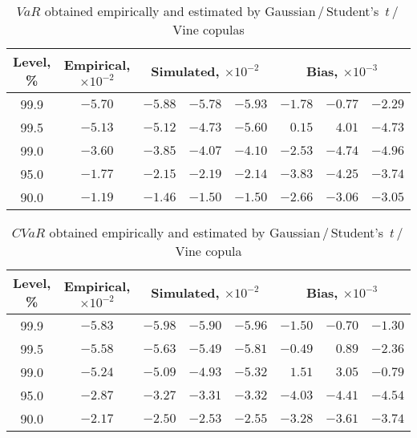 \documentclass{llncs}
\begin{document}
\begin{table}[htbp]
\centering
\caption{$VaR$ obtained empirically and estimated by Gaussian\,/\,Student's~$t$\,/\,Vine copulas}
\label{VaR-results}
\setlength{\tabcolsep}{5pt}
\begin{tabular}{c|c|r@{\,/\,}r@{\,/\,}r|r@{\,/\,}r@{\,/\,}r} \hline
\multicolumn{1}{c|}{Level, \%} & \multicolumn{1}{c|}{Empirical, $\times 10^{-2}$} & \multicolumn{3}{c|}{Simulated, $\times 10^{-2}$} & \multicolumn{3}{c}{Bias, $\times 10^{-3}$} \bigstrut \\ \hline 
99.9 & $-5.70$ & $-5.88$ & $-5.78$ & $-5.93$ & $-1.78$ & $-0.77$ & $-2.29$ \bigstrut[t] \\ 
99.5 & $-5.13$ & $-5.12$ & $-4.73$ & $-5.60$ & $0.15$ & $4.01$ & $-4.73$ \\ 
99.0   & $-3.60$ & $-3.85$ & $-4.07$ & $-4.10$ & $-2.53$ & $-4.74$ & $-4.96$ \\ 
95.0   & $-1.77$ & $-2.15$ & $-2.19$ & $-2.14$ & $-3.83$ & $-4.25$ & $-3.74$ \\ 
90.0   & $-1.19$ & $-1.46$ & $-1.50$ & $-1.50$ & $-2.66$ & $-3.06$ & $-3.05$ \bigstrut[b] \\ \hline
\end{tabular}
\end{table}

\begin{table}[htbp]
\centering
\caption{$CVaR$ obtained empirically and estimated by Gaussian\,/\,Student's~$t$\,/\,Vine copula}
\label{ES-results}
\setlength{\tabcolsep}{5pt}
\begin{tabular}{c|c|r@{\,/\,}r@{\,/\,}r|r@{\,/\,}r@{\,/\,}r} \hline
\multicolumn{1}{c|}{Level, \%} & \multicolumn{1}{c|}{Empirical, $\times 10^{-2}$} & \multicolumn{3}{c|}{Simulated, $\times 10^{-2}$} & \multicolumn{3}{c}{Bias, $\times 10^{-3}$} \bigstrut \\ \hline
99.9 & $-5.83$ & $-5.98$ & $-5.90$ & $-5.96$ & $-1.50$ & $-0.70$ & $-1.30$ \bigstrut[t] \\ 
99.5 & $-5.58$ & $-5.63$ & $-5.49$ & $-5.81$ & $-0.49$ & $0.89$ & $-2.36$ \\
99.0   & $-5.24$ & $-5.09$ & $-4.93$ & $-5.32$ & $1.51$ & $3.05$ & $-0.79$ \\
95.0   & $-2.87$ & $-3.27$ & $-3.31$ & $-3.32$ & $-4.03$ & $-4.41$ & $-4.54$ \\
90.0   & $-2.17$ & $-2.50$ & $-2.53$ & $-2.55$ & $-3.28$ & $-3.61$ & $-3.74$ \bigstrut[b] \\ \hline
\end{tabular}
\end{table}
\end{document}
